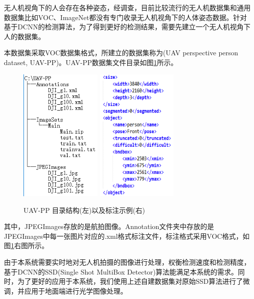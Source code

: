 
无人机视角下的人会存在各种姿态，经调查，目前比较流行的无人机数据集和通用数据集比如VOC、ImageNet都没有专门收录无人机视角下的人体姿态数据。针对基于DCNN的检测算法，为了得到更好的检测结果，需要先建立一个无人机视角下人的数据集。

本数据集采取VOC数据集格式，所建立的数据集称为(UAV perspective person dataset, UAV-PP)。UAV-PP数据集文件目录如图\ref{fold}所示。
\begin{figure}[h]
    \centering
    \includegraphics[width=4cm]{figures/目录结构.png}
    \qquad
    \includegraphics[width=4cm]{figures/标注示例.png}
    \caption{ UAV-PP 目录结构(左)以及标注示例(右)}\label{fold}
\end{figure}

其中，JPEGImages存放的是航拍图像。Annotation文件夹中存放的是JPEGImages中每一张图片对应的.xml格式标注文件，标注格式采用VOC格式，如图\ref{fold}右图所示。


由于本系统需要实时地对无人机拍摄的图像进行处理，权衡检测速度和检测精度，基于DCNN的SSD(Single Shot MultiBox Detector)算法能满足本系统的需求。同时，为了更好的应用于本系统，我们使用上述自建数据集对原始SSD算法进行了微调，并应用于地面端进行光学图像处理。

